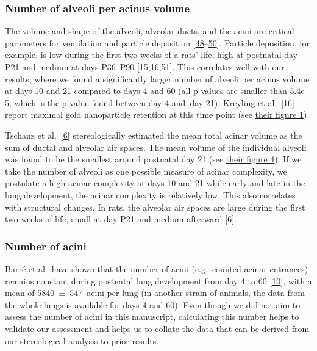 \documentclass[
  american,
]{article}
\begin{document}
\hypertarget{number-of-alveoli-per-acinus-volume}{%
\subsubsection{Number of alveoli per acinus volume}\label{number-of-alveoli-per-acinus-volume}}

The volume and shape of the alveoli, alveolar ducts, and the acini are critical parameters for ventilation and particle deposition {[}\protect\hyperlink{ref-eioib1TQ}{48}--\protect\hyperlink{ref-OT4s1CSX}{50}{]}.
Particle deposition, for example, is low during the first two weeks of a rats' life, high at postnatal day P21 and medium at days P36--P90 {[}\protect\hyperlink{ref-yHHhvOtP}{15},\protect\hyperlink{ref-18DcNLAv6}{16},\protect\hyperlink{ref-VJYqPtdT}{51}{]}.
This correlates well with our results, where we found a significantly larger number of alveoli per acinus volume at days 10 and 21 compared to days 4 and 60 (all p-values are smaller than 5.4e-5, which is the p-value found between day 4 and~day 21).
Kreyling et al.~{[}\protect\hyperlink{ref-18DcNLAv6}{16}{]} report maximal gold nanoparticle retention at this time point (see \href{https://pubs.acs.org/doi/10.1021/acsnano.8b01826\#fig1}{their figure 1}).

Tschanz et al.~{[}\protect\hyperlink{ref-wnl86DEM}{6}{]} stereologically estimated the mean total acinar volume as the sum of ductal and alveolar air spaces.
The mean volume of the individual alveoli was found to be the smallest around postnatal day 21 (see \href{https://www.physiology.org/na101/home/literatum/publisher/physio/journals/content/jappl/2014/jappl.2014.117.issue-1/japplphysiol.01355.2013/production/images/medium/zdg0121410620004.jpeg}{their figure 4}).
If we take the number of alveoli as one possible measure of acinar complexity, we postulate a high acinar complexity at days 10 and 21 while early and late in the lung development, the acinar complexity is relatively low.
This also correlates with structural changes.
In rats, the alveolar air spaces are large during the first two weeks of life, small at day P21 and medium afterward {[}\protect\hyperlink{ref-wnl86DEM}{6}{]}.

\hypertarget{number-of-acini-1}{%
\subsubsection{Number of acini}\label{number-of-acini-1}}

Barré et al.~have shown that the number of acini (e.g.~counted acinar entrances) remains constant during postnatal lung development from day 4 to 60 {[}\protect\hyperlink{ref-14OP85b2F}{10}{]}, with a mean of 5840~±~547~acini per lung (in another strain of animals, the data from the whole lungs is available for days 4 and 60).
Even though we did not aim to assess the number of acini in this manuscript, calculating this number helps to validate our assessment and helps us to collate the data that can be derived from our stereological analysis to prior results.
\end{document}
